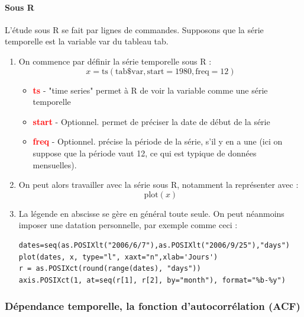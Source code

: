 \paragraph{Sous R}
L'étude sous R se fait par lignes de commandes.\newline
Supposons que la série temporelle est la variable var du tableau tab.
\begin{enumerate}
\item On commence par définir la série temporelle sous R :
$$x = \textrm{ts}(\textrm{tab}\$\textrm{var}, \textrm{start}=1980, \textrm{freq}=12)$$
\begin{itemize}
\item \textcolor{red}{\textbf{ts}} - "time series"\newline
permet à R de voir la variable comme une série temporelle
\item \textcolor{red}{\textbf{start}} - Optionnel.\newline
permet de préciser la date de début de la série
\item \textcolor{red}{\textbf{freq}} - Optionnel.\newline
précise la période de la série, s'il y en a une (ici on suppose que la période vaut 12, ce qui est typique de données mensuelles). 
\end{itemize}
\item On peut alors travailler avec la série sous R, notamment la représenter avec :
$$\textrm{plot}(x)$$
\item La légende en abscisse se gère en général toute seule. On peut néanmoins imposer une datation personnelle, par exemple comme ceci :
\begin{lstlisting}[language=html]
dates=seq(as.POSIXlt("2006/6/7"),as.POSIXlt("2006/9/25"),"days")
plot(dates, x, type="l", xaxt="n",xlab='Jours')
r = as.POSIXct(round(range(dates), "days"))
axis.POSIXct(1, at=seq(r[1], r[2], by="month"), format="%b-%y")
\end{lstlisting}
\end{enumerate}
\subsubsection{Dépendance temporelle, la fonction d'autocorrélation (ACF) }
